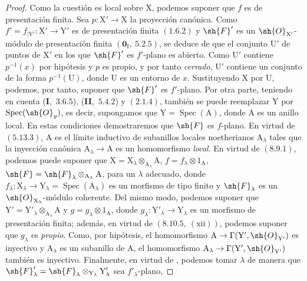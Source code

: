\begin{proof}
Como la cuestión es local sobre $\mathrm{X}$, podemos suponer que $f$ es de presentación finita. Sea
$p:\mathrm{X}'\to\mathrm{X}$ la proyección canónica. Como
$f'=f_{|\mathrm{Y}'}:\mathrm{X}'\to\mathrm{Y}'$ es de presentación finita
$(1.6.2)$ y $\sh{F}'$ es un $\sh{O}_{\mathrm{X}'}$-módulo de presentación finita $(\mathbf{0}_\mathrm{I},~5.2.5)$, se deduce
de  que el conjunto $\mathrm{U}'$ de puntos de $\mathrm{X}'$ en los que $\sh{F}'$ es $f'$-plano es abierto. Como $\mathrm{U}'$
contiene $p^{-1}(x)$ por hipótesis y $p$ es propio, y por tanto \emph{cerrado}, $\mathrm{U}'$ contiene un conjunto de la forma
$p^{-1}(\mathrm{U})$, donde $\mathrm{U}$ es un entorno de $x$. Sustituyendo $\mathrm{X}$ por $\mathrm{U}$, podemos, por tanto,
suponer que $\sh{F}'$ es $f'$-plano. Por otra parte, teniendo en cuenta (\textbf{I},~$3.6.5$), (\textbf{II},~$5.4.2$)
y $(2.1.4)$, también se puede reemplazar $\mathrm{Y}$ por $\operatorname{Spec}(\sh{O}_y)$, es decir, supongamos que $\mathrm{Y}=\operatorname{Spec}(\mathrm{A})$,
donde $\mathrm{A}$ es un anillo local. En estas condiciones demostraremos que $\sh{F}$ es $f$-plano. En virtud
de $(5.13.3)$, $\mathrm{A}$ es el límite inductivo de subanillos locales noetherianos $\mathrm{A}_\lambda$ tales que
la inyección canónica $\mathrm{A}_\lambda\to\mathrm{A}$ es un homomorfismo \emph{local}. En virtud de $(8.9.1)$, podemos
puede suponer que $\mathrm{X}=\mathrm{X}_\lambda\otimes_{\mathrm{A}_\lambda}\mathrm{A}$, $f=f_\lambda\otimes 1_\mathrm{A}$, $\sh{F}=\sh{F}_\lambda\otimes_{\mathrm{A}_\lambda}\mathrm{A}$,
para un $\lambda$ adecuado, donde $f_\lambda:\mathrm{X}_\lambda\to\mathrm{Y}_\lambda=\operatorname{Spec}(\mathrm{A}_\lambda)$ es un morfismo de tipo finito y
$\sh{F}_\lambda$ es un $\sh{O}_{\mathrm{X}_\lambda}$-módulo coherente.
Del mismo modo, podemos suponer que $\mathrm{Y}'=\mathrm{Y}'_\lambda\otimes_{\mathrm{A}_\lambda}\mathrm{A}$ y $g=g_\lambda\otimes 1_\mathrm{A}$, donde $g_\lambda:\mathrm{Y}'_\lambda\to\mathrm{Y}_\lambda$ es un
morfismo de presentación finita; además, en virtud de $(8.10.5,~(\text{xii}))$, podemos suponer que $g_\lambda$ es
\emph{propio}. Como, por hipótesis, el homomorfismo $\mathrm{A}\to\Gamma(\mathrm{Y}',\sh{O}_{\mathrm{Y}'})$ es inyectivo y $\mathrm{A}_\lambda$
es un subanillo de $\mathrm{A}$, el homomorfismo $\mathrm{A}_\lambda\to\Gamma(\mathrm{Y}',\sh{O}_{\mathrm{Y}'})$ también es inyectivo. Finalmente,
en virtud de , podemos tomar $\lambda$ de manera que $\sh{F}'_\lambda=\sh{F}_\lambda\otimes_{\mathrm{Y}_\lambda}\mathrm{Y}'_\lambda$ sea $f'_\lambda$-plano,

\end{proof}
